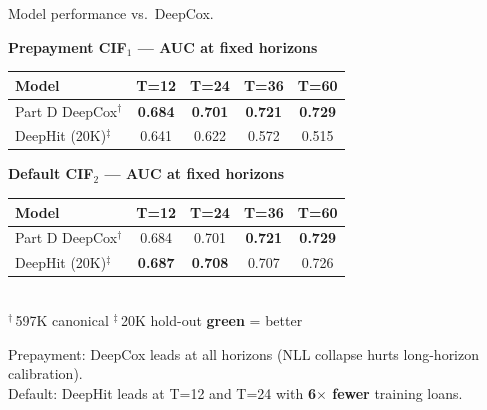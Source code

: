 \documentclass[10pt,aspectratio=169]{beamer}
\begin{document}
\begin{frame}{Model performance vs.\ DeepCox.}
    \begin{center}
        \small\textbf{Prepayment CIF$_1$ --- AUC at fixed horizons}\\[4pt]
        \begin{tabular}{lcccc}
            \toprule
            \textbf{Model} & \textbf{T=12} & \textbf{T=24} & \textbf{T=36} & \textbf{T=60} \\
            \midrule
            Part D DeepCox$^\dagger$ & \textcolor{good}{\textbf{0.684}} & \textcolor{good}{\textbf{0.701}} & \textcolor{good}{\textbf{0.721}} & \textcolor{good}{\textbf{0.729}} \\
            DeepHit (20K)$^\ddagger$ & 0.641 & 0.622 & 0.572 & 0.515 \\
            \bottomrule
        \end{tabular}

        \vspace{8pt}
        \small\textbf{Default CIF$_2$ --- AUC at fixed horizons}\\[4pt]
        \begin{tabular}{lcccc}
            \toprule
            \textbf{Model} & \textbf{T=12} & \textbf{T=24} & \textbf{T=36} & \textbf{T=60} \\
            \midrule
            Part D DeepCox$^\dagger$  & 0.684 & 0.701 & \textcolor{good}{\textbf{0.721}} & \textcolor{good}{\textbf{0.729}} \\
            DeepHit (20K)$^\ddagger$  & \textcolor{good}{\textbf{0.687}} & \textcolor{good}{\textbf{0.708}} & 0.707 & 0.726 \\
            \bottomrule
        \end{tabular}
        \vspace{3pt}\\
        \tiny $^\dagger$\,597K canonical \quad $^\ddagger$\,20K hold-out \quad \textcolor{good}{\textbf{green}} = better
    \end{center}

    \vfill
    \begin{center}
        \small
        Prepayment: DeepCox leads at all horizons (NLL collapse hurts long-horizon calibration).\\
        Default: DeepHit leads at T=12 and T=24 with \textbf{6$\times$ fewer} training loans.
    \end{center}
\end{frame}
\end{document}
